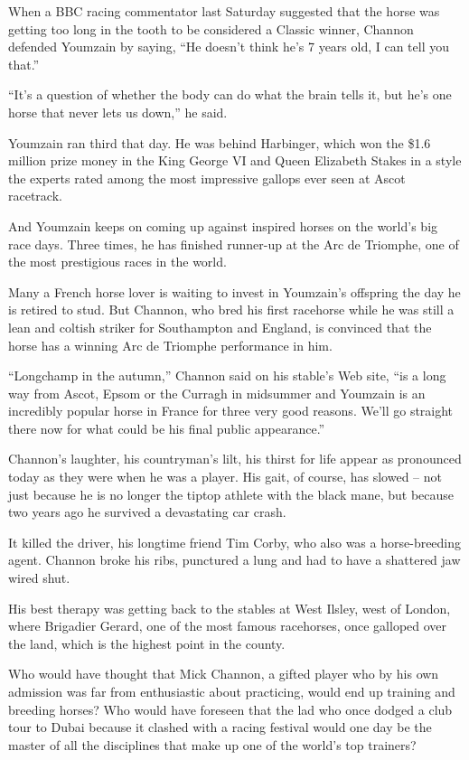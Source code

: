 ﻿\documentclass[12pt]{article}
\begin{document}
When a BBC racing commentator last Saturday suggested that the horse was getting too long in the
tooth to be considered a Classic winner, Channon defended Youmzain by saying, ``He doesn't think
he's 7 years old, I can tell you that.''

``It's a question of whether the body can do what the brain tells it, but he's one horse that never
lets us down,'' he said.

Youmzain ran third that day. He was behind Harbinger, which won the \$1.6 million prize money in the
King George VI and Queen Elizabeth Stakes in a style the experts rated among the most impressive
gallops ever seen at Ascot racetrack.

And Youmzain keeps on coming up against inspired horses on the world's big race days. Three times,
he has finished runner-up at the Arc de Triomphe, one of the most prestigious races in the world.

Many a French horse lover is waiting to invest in Youmzain's offspring the day he is retired to
stud. But Channon, who bred his first racehorse while he was still a lean and coltish striker for
Southampton and England, is convinced that the horse has a winning Arc de Triomphe performance in
him.

``Longchamp in the autumn,'' Channon said on his stable's Web site, ``is a long way from Ascot,
Epsom or the Curragh in midsummer and Youmzain is an incredibly popular horse in France for three
very good reasons. We'll go straight there now for what could be his final public appearance.''

Channon's laughter, his countryman's lilt, his thirst for life appear as pronounced today as they
were when he was a player. His gait, of course, has slowed -- not just because he is no longer the
tiptop athlete with the black mane, but because two years ago he survived a devastating car crash.

It killed the driver, his longtime friend Tim Corby, who also was a horse-breeding agent. Channon
broke his ribs, punctured a lung and had to have a shattered jaw wired shut.

His best therapy was getting back to the stables at West Ilsley, west of London, where Brigadier
Gerard, one of the most famous racehorses, once galloped over the land, which is the highest point
in the county.

Who would have thought that Mick Channon, a gifted player who by his own admission was far from
enthusiastic about practicing, would end up training and breeding horses? Who would have foreseen
that the lad who once dodged a club tour to Dubai because it clashed with a racing festival would
one day be the master of all the disciplines that make up one of the world's top trainers?
\end{document}
